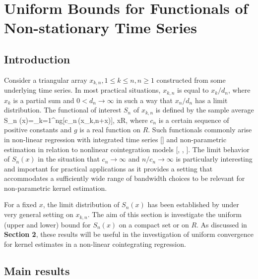 \chapter{Uniform Bounds for Functionals of Non-stationary Time Series}
\ifpdf
    \graphicspath{{Chapter2/Chapter2Figs/PNG/}{Chapter2/Chapter2Figs/PDF/}{Chapter2/Chapter2Figs/}}
\else
    \graphicspath{{Chapter2/Chapter2Figs/EPS/}{Chapter2/Chapter2Figs/}}
\fi

\section{Introduction}
Consider a triangular array ${x_{k,n},1\leq k\leq n,n\geq
1}$ constructed from some underlying time series.
In most practical situations, $x_{k,n}$ is equal to $x_k/d_n$, where $x_k$
is a partial sum and $0 < d_n\to \infty$ in such a way that $x_n/d_n$ has a limit distribution.  The functional of interest $
S_{n}$ of $x_{k,n}$ is defined by the sample average
\bestar
S_{n} (x)=\sum_{k=1}^{n}g[c_{n}\,(x_{k,n}+x)], \quad x\in R,
\eestar
where $c_{n}$ is a certain sequence of positive constants and $g$ is
a real function on $R$. Such functionals commonly arise in
non-linear regression with integrated time series [\citet[][\citeyear{parkphillips2001}]{parkphillips1999}] and non-parametric estimation in relation to nonlinear cointegration models [\cite{phillipspark1998}, \cite{karlsentjostheim2001}, \citet[][\citeyear{wangphillips2010a}, \citeyear{wangphillips2010b}]{wangphillips2009}]. The limit
behavior of $S_{n}(x)$ in the situation that $c_{n}\rightarrow \infty $ and $%
n/c_{n}\rightarrow \infty $ is particularly interesting and
important for practical applications as it provides a setting that
accommodates a sufficiently wide range of bandwidth choices to be
relevant for non-parametric kernel estimation.

For a fixed $x$, the limit distribution of $S_n(x)$ has been established by \citet[][\citeyear{wangphillips2010a}, \citeyear{wangphillips2010b}]{wangphillips2009} under very general setting on $x_{k,n}$. The aim of this section is investigate the uniform (upper and lower) bound  for $S_n(x)$ on a compact set or on $R$. As discussed in {\bf \color{red} Section 2}, these results will be useful in the investigation of uniform convergence for kernel estimates in a non-linear cointegrating regression. 


\section{Main results}

